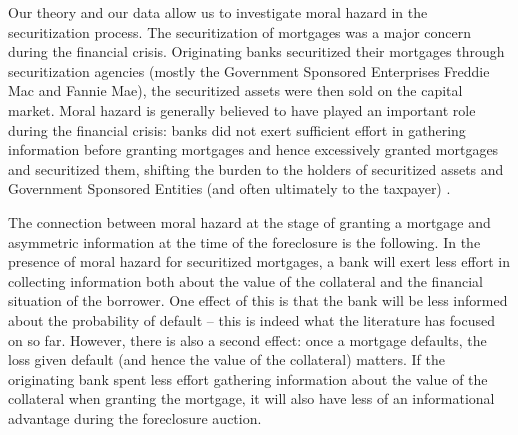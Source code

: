 \documentclass[11pt,twopage]{article}
\begin{document}
%

Our theory and our data allow us to investigate moral hazard in the
securitization process.  The securitization of mortgages was a major
concern during the financial crisis.  Originating banks securitized
their mortgages through securitization agencies (mostly the Government
Sponsored Enterprises Freddie Mac and Fannie Mae), the securitized
assets were then sold on the capital market. Moral hazard is generally
believed to have played an important role during the financial crisis:
banks did not exert sufficient effort in gathering information before
granting mortgages and hence excessively granted mortgages and
securitized them, shifting the burden to the holders of securitized
assets and Government Sponsored Entities (and often ultimately to the
taxpayer) \cite[see][]{mian2009consequences,dewatripont2010balancing,keys2008did}.

The connection between moral hazard at the stage of granting a
mortgage and asymmetric information at the time of the foreclosure is
the following. In the presence of moral hazard for securitized
mortgages, a bank will exert less effort in collecting information
both about the value of the collateral and the financial situation of
the borrower. One effect of this is that the bank will be less
informed about the probability of default -- this is indeed what the
literature has focused on so far. However, there is also a second
effect: once a mortgage defaults, the loss given default (and hence
the value of the collateral) matters. If the originating bank spent
less effort gathering information about the value of the collateral
when granting the mortgage, it will also have less of an informational
advantage during the foreclosure auction.
\end{document}
